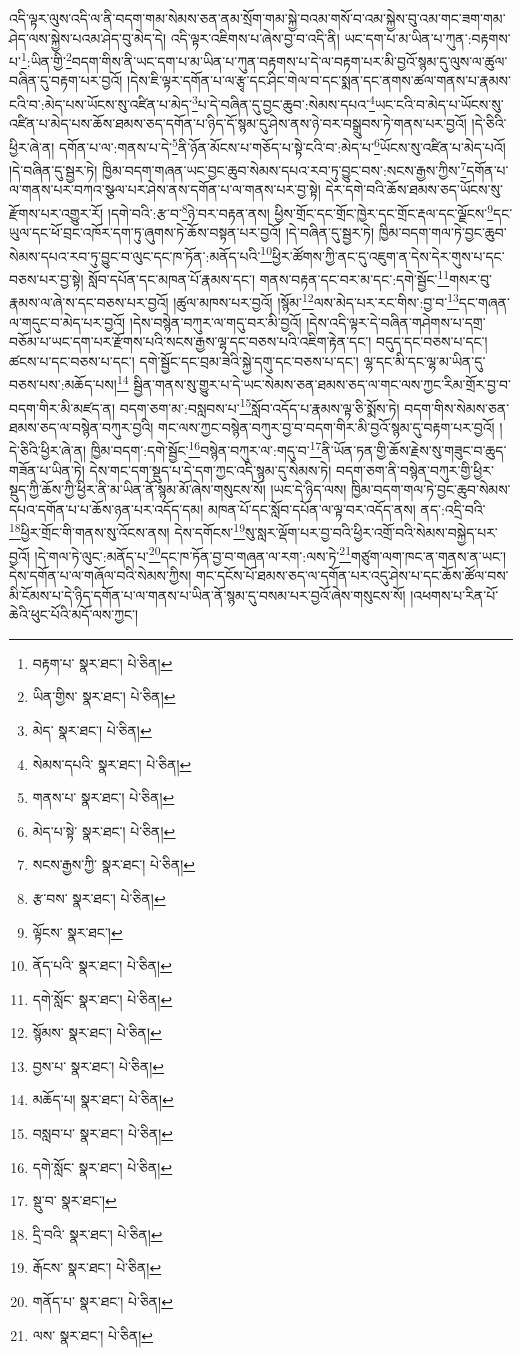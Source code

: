 འདི་ལྟར་ལུས་འདི་ལ་ནི་བདག་གམ་སེམས་ཅན་ནམ་སྲོག་གམ་སྐྱེ་བའམ་གསོ་བ་འམ་སྐྱེས་བུ་འམ་གང་ཟག་གམ་ཤེད་ལས་སྐྱེས་པའམ་ཤེད་བུ་མེད་དེ། འདི་ལྟར་འཇིགས་པ་ཞེས་བྱ་བ་འདི་ནི། ཡང་དག་པ་མ་ཡིན་པ་ཀུན་:བརྟགས་པ་\footnote{བརྟག་པ་  སྣར་ཐང་།  པེ་ཅིན། }:ཡིན་གྱི་\footnote{ཡིན་གྱིས་  སྣར་ཐང་།  པེ་ཅིན། }བདག་གིས་ནི་ཡང་དག་པ་མ་ཡིན་པ་ཀུན་བརྟགས་པ་དེ་ལ་བརྟག་པར་མི་བྱའོ་སྙམ་དུ་ལུས་ལ་ཚུལ་བཞིན་དུ་བརྟག་པར་བྱའོ། །དེས་ཇི་ལྟར་དགོན་པ་ལ་རྩྭ་དང་ཤིང་གེལ་བ་དང་སྨན་དང་ནགས་ཚལ་གནས་པ་རྣམས་ངའི་བ་:མེད་པས་ཡོངས་སུ་འཛིན་པ་མེད་\footnote{མེད་  སྣར་ཐང་།  པེ་ཅིན། }པ་དེ་བཞིན་དུ་བྱང་ཆུབ་:སེམས་དཔའ་\footnote{སེམས་དཔའི་  སྣར་ཐང་།  པེ་ཅིན། }ཡང་ངའི་བ་མེད་པ་ཡོངས་སུ་འཛིན་པ་མེད་པས་ཆོས་ཐམས་ཅད་དགོན་པ་ཉིད་དོ་སྙམ་དུ་ཤེས་ནས་ཉེ་བར་བསྒྲུབས་ཏེ་གནས་པར་བྱའོ། །དེ་ཅིའི་ཕྱིར་ཞེ་ན། དགོན་པ་ལ་:གནས་པ་དེ་\footnote{གནས་པ་  སྣར་ཐང་།  པེ་ཅིན། }ནི་ཉོན་མོངས་པ་གཅོད་པ་སྟེ་ངའི་བ་:མེད་པ་\footnote{མེད་པ་སྟེ་  སྣར་ཐང་།  པེ་ཅིན། }ཡོངས་སུ་འཛིན་པ་མེད་པའོ། །དེ་བཞིན་དུ་སྦྱར་ཏེ། ཁྱིམ་བདག་གཞན་ཡང་བྱང་ཆུབ་སེམས་དཔའ་རབ་ཏུ་བྱུང་བས་:སངས་རྒྱས་ཀྱིས་\footnote{སངས་རྒྱས་ཀྱི་  སྣར་ཐང་།  པེ་ཅིན། }དགོན་པ་ལ་གནས་པར་བཀའ་སྩལ་པར་ཤེས་ནས་དགོན་པ་ལ་གནས་པར་བྱ་སྟེ། དེར་དགེ་བའི་ཆོས་ཐམས་ཅད་ཡོངས་སུ་རྫོགས་པར་འགྱུར་རོ། །དགེ་བའི་:རྩ་བ་\footnote{རྩ་བས་  སྣར་ཐང་།  པེ་ཅིན། }ཉེ་བར་བརྟན་ནས། ཕྱིས་གྲོང་དང་གྲོང་ཁྱེར་དང་གྲོང་རྡལ་དང་ལྗོངས་\footnote{ལྟོངས་  སྣར་ཐང་། }དང་ཡུལ་དང་ཕོ་བྲང་འཁོར་དག་ཏུ་ཞུགས་ཏེ་ཆོས་བསྟན་པར་བྱའོ། །དེ་བཞིན་དུ་སྦྱར་ཏེ། ཁྱིམ་བདག་གལ་ཏེ་བྱང་ཆུབ་སེམས་དཔའ་རབ་ཏུ་བྱུང་བ་ལུང་དང་ཁ་ཏོན་:མནོད་པའི་\footnote{ནོད་པའི་  སྣར་ཐང་།  པེ་ཅིན། }ཕྱིར་ཚོགས་ཀྱི་ནང་དུ་འཇུག་ན་དེས་དེར་གུས་པ་དང་བཅས་པར་བྱ་སྟེ། སློབ་དཔོན་དང་མཁན་པོ་རྣམས་དང་། གནས་བརྟན་དང་བར་མ་དང་:དགེ་སྦྱོང་\footnote{དགེ་སློང་  སྣར་ཐང་།  པེ་ཅིན། }གསར་བུ་རྣམས་ལ་ཞེ་ས་དང་བཅས་པར་བྱའོ། །ཚུལ་མཁས་པར་བྱའོ། །སྙོམ་\footnote{སྙོམས་  སྣར་ཐང་།  པེ་ཅིན། }ལས་མེད་པར་རང་གིས་:བྱ་བ་\footnote{བྱས་པ་  སྣར་ཐང་།  པེ་ཅིན། }དང་གཞན་ལ་གདུང་བ་མེད་པར་བྱའོ། །དེས་བསྙེན་བཀུར་ལ་གདུ་བར་མི་བྱའོ། །དེས་འདི་ལྟར་དེ་བཞིན་གཤེགས་པ་དགྲ་བཅོམ་པ་ཡང་དག་པར་རྫོགས་པའི་སངས་རྒྱས་ལྷ་དང་བཅས་པའི་འཇིག་རྟེན་དང་། བདུད་དང་བཅས་པ་དང་། ཚངས་པ་དང་བཅས་པ་དང་། དགེ་སྦྱོང་དང་བྲམ་ཟེའི་སྐྱེ་དགུ་དང་བཅས་པ་དང་། ལྷ་དང་མི་དང་ལྷ་མ་ཡིན་དུ་བཅས་པས་:མཆོད་པས།\footnote{མཆོད་པ།  སྣར་ཐང་།  པེ་ཅིན། } སྦྱིན་གནས་སུ་གྱུར་པ་དེ་ཡང་སེམས་ཅན་ཐམས་ཅད་ལ་གང་ལས་ཀྱང་རིམ་གྲོར་བྱ་བ་བདག་གིར་མི་མཛད་ན། བདག་ཅག་མ་:བསླབས་པ་\footnote{བསླབ་པ་  སྣར་ཐང་།  པེ་ཅིན། }སློབ་འདོད་པ་རྣམས་ལྟ་ཅི་སྨོས་ཏེ། བདག་གིས་སེམས་ཅན་ཐམས་ཅད་ལ་བསྙེན་བཀུར་བྱའི། གང་ལས་ཀྱང་བསྙེན་བཀུར་བྱ་བ་བདག་གིར་མི་བྱའོ་སྙམ་དུ་བརྟག་པར་བྱའོ། །དེ་ཅིའི་ཕྱིར་ཞེ་ན། ཁྱིམ་བདག་:དགེ་སྦྱོང་\footnote{དགེ་སློང་  སྣར་ཐང་།  པེ་ཅིན། }བསྙེན་བཀུར་ལ་:གདུ་བ་\footnote{སྡུ་བ་  སྣར་ཐང་། }ནི་ཡོན་ཏན་གྱི་ཆོས་རྗེས་སུ་གཟུང་བ་ཆུད་གཟོན་པ་ཡིན་ཏེ། དེས་གང་དག་སྡུད་པ་དེ་དག་ཀྱང་འདི་སྙམ་དུ་སེམས་ཏེ། བདག་ཅག་ནི་བསྙེན་བཀུར་གྱི་ཕྱིར་སྡུད་ཀྱི་ཆོས་ཀྱི་ཕྱིར་ནི་མ་ཡིན་ནོ་སྙམ་མོ་ཞེས་གསུངས་སོ། །ཡང་དེ་ཉིད་ལས། ཁྱིམ་བདག་གལ་ཏེ་བྱང་ཆུབ་སེམས་དཔའ་དགོན་པ་པ་ཆོས་ཉན་པར་འདོད་དམ། མཁན་པོ་དང་སློབ་དཔོན་ལ་ལྟ་བར་འདོད་ནས། ནད་:འདྲི་བའི་\footnote{དྲི་བའི་  སྣར་ཐང་།  པེ་ཅིན། }ཕྱིར་གྲོང་གི་གནས་སུ་འོངས་ནས། དེས་དགོངས་\footnote{རྒོངས་  སྣར་ཐང་།  པེ་ཅིན། }སུ་སླར་ལྡོག་པར་བྱ་བའི་ཕྱིར་འགྲོ་བའི་སེམས་བསྐྱེད་པར་བྱའོ། །དེ་གལ་ཏེ་ལུང་:མནོད་པ་\footnote{གནོད་པ་  སྣར་ཐང་།  པེ་ཅིན། }དང་ཁ་ཏོན་བྱ་བ་གཞན་ལ་རག་:ལས་ཏེ་\footnote{ལས་  སྣར་ཐང་།  པེ་ཅིན། }གཙུག་ལག་ཁང་ན་གནས་ན་ཡང་། དེས་དགོན་པ་ལ་གཞོལ་བའི་སེམས་ཀྱིས། གང་དངོས་པོ་ཐམས་ཅད་ལ་དགོན་པར་འདུ་ཤེས་པ་དང་ཆོས་ཚོལ་བས་མི་ངོམས་པ་དེ་ཉིད་དགོན་པ་ལ་གནས་པ་ཡིན་ནོ་སྙམ་དུ་བསམ་པར་བྱའོ་ཞེས་གསུངས་སོ། །འཕགས་པ་རིན་པོ་ཆེའི་ཕུང་པོའི་མདོ་ལས་ཀྱང་། 